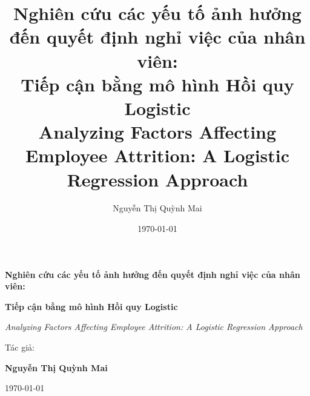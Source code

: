 \documentclass[12pt,a4paper]{report}
\title{
  \textbf{Nghiên cứu các yếu tố ảnh hưởng đến quyết định nghỉ việc của nhân viên:}\\
  \textbf{Tiếp cận bằng mô hình Hồi quy Logistic}\\
  \vspace{0.35cm}
  \large Analyzing Factors Affecting Employee Attrition: A Logistic Regression Approach
}
\author{Nguyễn Thị Quỳnh Mai}
\date{\today}
\begin{document}
\begin{titlepage}
  \centering
  \vspace*{2cm}
  {\LARGE\bfseries Nghiên cứu các yếu tố ảnh hưởng đến quyết định nghỉ việc của nhân viên:\par}
  \vspace{0.25cm}
  {\LARGE\bfseries Tiếp cận bằng mô hình Hồi quy Logistic\par}
  \vspace{0.8cm}
  {\Large\itshape Analyzing Factors Affecting Employee Attrition: A Logistic Regression Approach\par}
  \vspace{2cm}
  {\large Tác giả:\par}
  {\Large\bfseries Nguyễn Thị Quỳnh Mai\par}
  \vfill
  {\large \today\par}
\end{titlepage}

\tableofcontents
\clearpage
\listoffigures
{}
\clearpage
\listoftables
{}
\clearpage
{}











\appendix

\end{document}

